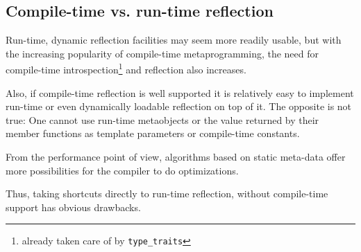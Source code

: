 \subsection{Compile-time vs. run-time reflection}

Run-time, dynamic reflection facilities may seem more readily
usable, but with the increasing popularity of compile-time metaprogramming,
the need for compile-time introspection\footnote{already taken care of
by \texttt{type\_traits}} and reflection also increases.

Also, if compile-time reflection is well supported it is relatively
easy to implement run-time or even dynamically loadable reflection
on top of it. The opposite is not true: One cannot use run-time metaobjects
or the value returned by their member functions as template parameters
or compile-time constants.

From the performance point of view, algorithms based on static
meta-data offer more possibilities for the compiler to do
optimizations.

Thus, taking shortcuts directly to run-time reflection, without
compile-time support has obvious drawbacks.

